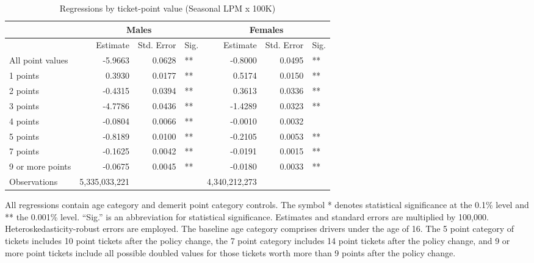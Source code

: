 
\begin{table}%
\centering 
\begin{tabular}{l r r l r r l} 

\hline 
 
 & \multicolumn{3}{c}{Males} & \multicolumn{3}{c}{Females} \\ 

\hline 
 
 & Estimate & Std. Error & Sig. & Estimate & Std. Error & Sig. \\ 

\hline 
 
All point values                &  -5.9663        &  0.0628       &   **       &  -0.8000        &  0.0495       &   **       \\ 
1 points                        &  0.3930        &  0.0177       &   **       &  0.5174        &  0.0150       &   **       \\ 
2 points                        &  -0.4315        &  0.0394       &   **       &  0.3613        &  0.0336       &   **       \\ 
3 points                        &  -4.7786        &  0.0436       &   **       &  -1.4289        &  0.0323       &   **       \\ 
4 points                        &  -0.0804        &  0.0066       &   **       &  -0.0010        &  0.0032       &            \\ 
5 points                        &  -0.8189        &  0.0100       &   **       &  -0.2105        &  0.0053       &   **       \\ 
7 points                        &  -0.1625        &  0.0042       &   **       &  -0.0191        &  0.0015       &   **       \\ 
9 or more points                &  -0.0675        &  0.0045       &   **       &  -0.0180        &  0.0033       &   **       \\ 
Observations            & 5,335,033,221    &          &              &  4,340,212,273 \\ 


\hline 

\end{tabular} 
\caption{Regressions by ticket-point value (Seasonal LPM x 100K)} 
All regressions contain age category and demerit point category controls. 
The symbol * denotes statistical significance at the 0.1\% level 
and ** the 0.001\% level. 
``Sig.'' is an abbreviation for statistical significance. 
Estimates and standard errors are multiplied by 100,000. 
Heteroskedasticity-robust errors are employed. 
The baseline age category comprises drivers under the age of 16. 
The 5 point category of tickets includes 10 point tickets after the policy change,  
the 7 point category includes 14 point tickets after the policy change,  
and 9 or more point tickets include all possible doubled values for those tickets  
worth more than 9 points after the policy change. 
\label{tab:seas_LPMx100K_regs_by_points} 
\end{table} 
 
